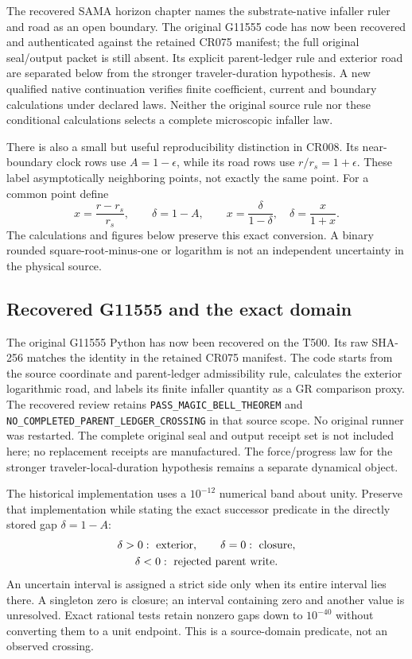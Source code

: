 \documentclass[10pt,twocolumn,letterpaper]{article}
\begin{document}
The recovered SAMA horizon chapter names the substrate-native infaller ruler and road as an open boundary.\cite{sama} The original G11555 code has now been recovered and authenticated against the retained CR075 manifest; the full original seal/output packet is still absent. Its explicit parent-ledger rule and exterior road are separated below from the stronger traveler-duration hypothesis. A new qualified native continuation verifies finite coefficient, current and boundary calculations under declared laws. Neither the original source rule nor these conditional calculations selects a complete microscopic infaller law.

There is also a small but useful reproducibility distinction in CR008. Its near-boundary clock rows use $A=1-\epsilon$, while its road rows use $r/r_s=1+\epsilon$. These label asymptotically neighboring points, not exactly the same point. For a common point define
\begin{equation}
 x=\frac{r-r_s}{r_s},\qquad \delta=1-A,
 \qquad x=\frac{\delta}{1-\delta},\quad\delta=\frac{x}{1+x}.
\end{equation}
The calculations and figures below preserve this exact conversion. A binary rounded square-root-minus-one or logarithm is not an independent uncertainty in the physical source.


\subsection{Recovered G11555 and the exact domain}
The original G11555 Python has now been recovered on the T500. Its raw
SHA-256 matches the identity in the retained CR075 manifest. The code
starts from the source coordinate and parent-ledger admissibility rule,
calculates the exterior logarithmic road, and labels its finite infaller
quantity as a GR comparison proxy. The recovered review retains
\texttt{PASS\_MAGIC\_BELL\_THEOREM} and
\texttt{NO\_COMPLETED\_PARENT\_LEDGER\_CROSSING} in that source scope.
No original runner was restarted. The complete original seal and output
receipt set is not included here; no replacement receipts are manufactured.
The force/progress law for the stronger traveler-local-duration hypothesis
remains a separate dynamical object.

The historical implementation uses a $10^{-12}$ numerical band about
unity. Preserve that implementation while stating the exact successor
predicate in the directly stored gap $\delta=1-A$:
\[
\begin{gathered}\delta>0:\ \hbox{exterior},\qquad\delta=0:\ \hbox{closure},\\
 \delta<0:\ \hbox{rejected parent write}.\end{gathered}
\]
An uncertain interval is assigned a strict side only when its entire
interval lies there. A singleton zero is closure; an interval containing
zero and another value is unresolved. Exact rational tests retain
nonzero gaps down to $10^{-40}$ without converting them to a unit endpoint.
This is a source-domain predicate, not an observed crossing.
\end{document}
